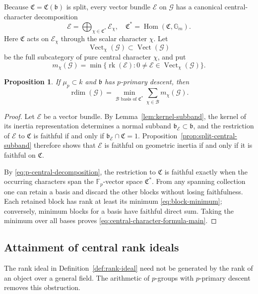 \documentclass[11pt,reqno]{amsart}
\numberwithin{equation}{section}
\theoremstyle{plain}
\newtheorem{prop}{Proposition}[section]
\theoremstyle{definition}
\def\cG{{\mathcal G}}
\def\cE{{\mathcal E}}
\def\fC{{\mathfrak C}}
\def\bG{{\mathbb G}}
\def\rk{{\operatorname{rk}}}
\def\Hom{{\operatorname{Hom}}}
\def\Vect{{\operatorname{Vect}}}
\def\rdim{{\operatorname{rdim}}}
\def\band{{\mathfrak b}}
\begin{document}
Because $\fC=\fC(\band)$ is split, every vector bundle $\cE$ on $\cG$
has a canonical central-character decomposition
\begin{equation}\label{eq:p-central-decomposition}
\cE=\bigoplus_{\chi\in\fC^*}\cE_\chi,
\quad
\fC^*=\Hom(\fC,\bG_m).
\end{equation}
Here $\fC$ acts on $\cE_\chi$ through the scalar character $\chi$.  Let
\[
\Vect_\chi(\cG)\subset\Vect(\cG)
\]
be the full subcategory of pure central character $\chi$, and put
\begin{equation}\label{eq:block-minimum}
m_\chi(\cG)=
\min\{\rk(\cE):0\ne \cE\in\Vect_\chi(\cG)\}.
\end{equation}

\begin{prop}\label{prop:central-character-main}
If $\mu_p\subset k$ and $\band$ has $p$-primary descent, then
\begin{equation}\label{eq:central-character-formula-main}
\rdim(\cG)=
\min_{\mathcal B\text{ basis of }\fC^*}
\sum_{\chi\in\mathcal B}m_\chi(\cG).
\end{equation}
\end{prop}

\begin{proof}
Let $\cE$ be a vector bundle.  By Lemma~\ref{lem:kernel-subband}, the
kernel of its inertia representation determines a normal subband
$\band_{\cE}\subset\band$, and the restriction of $\cE$ to $\fC$ is
faithful if and only if $\band_{\cE}\cap\fC=1$.
Proposition~\ref{prop:split-central-subband} therefore shows that $\cE$
is faithful on geometric inertia if and only if it is faithful on $\fC$.

By \eqref{eq:p-central-decomposition}, the restriction to $\fC$ is faithful
exactly when the occurring characters span the $\mathbb F_p$-vector space
$\fC^*$.  From any spanning collection one can retain a basis and discard
the other blocks without losing faithfulness.  Each retained block has rank at
least its minimum \eqref{eq:block-minimum}; conversely, minimum blocks for a
basis have faithful direct sum.  Taking the minimum over all bases proves
\eqref{eq:central-character-formula-main}.
\end{proof}


\subsection{Attainment of central rank ideals}

The rank ideal in Definition~\ref{def:rank-ideal} need not be
generated by the rank of an object over a general field.  The arithmetic of
$p$-groups with $p$-primary descent removes this obstruction.
\end{document}
